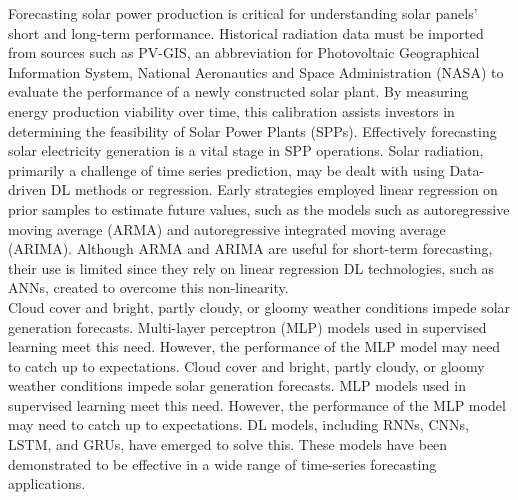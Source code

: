 Forecasting solar power production is critical for understanding solar panels' short and long-term performance. Historical radiation data must be imported from sources such as PV-GIS, an abbreviation for Photovoltaic Geographical Information System, National Aeronautics and Space Administration (NASA) to evaluate the performance of a newly constructed solar plant. By measuring energy production viability over time, this calibration assists investors in determining the feasibility of Solar Power Plants (SPPs). Effectively forecasting solar electricity generation is a vital stage in SPP operations. Solar radiation, primarily a challenge of time series prediction, may be dealt with using Data-driven DL methods or regression. Early strategies employed linear regression on prior samples to estimate future values, such as the models such as autoregressive moving average (ARMA) and autoregressive integrated moving average (ARIMA). Although ARMA and ARIMA are useful for short-term forecasting, their use is limited since they rely on linear regression DL technologies, such as ANNs, created to overcome this non-linearity.\\
Cloud cover and bright, partly cloudy, or gloomy weather conditions impede solar generation forecasts. Multi-layer perceptron (MLP) models used in supervised learning meet this need. However, the performance of the MLP model may need to catch up to expectations. Cloud cover and bright, partly cloudy, or gloomy weather conditions impede solar generation forecasts. MLP models used in supervised learning meet this need. However, the performance of the MLP model may need to catch up to expectations. DL models, including RNNs, CNNs, LSTM, and GRUs, have emerged to solve this. These models have been demonstrated to be effective in a wide range of time-series forecasting applications.\\
